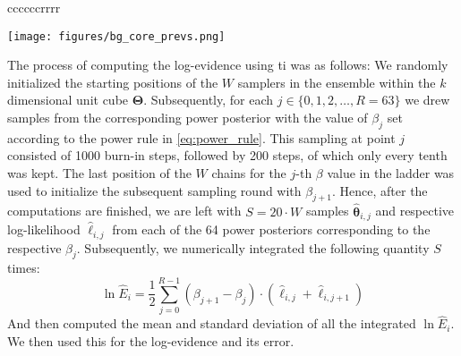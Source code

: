 \documentclass[twocolumn]{aastex631}
\begin{document}
\begin{deluxetable}{ccccccrrrr}
    \startdata
    \enddata
\end{deluxetable}

\begin{figure*}[h]
    \begin{centering}
        \texttt{[image: figures/bg\_core\_prevs.png]}
        \caption{Prevalence of involvement as predicted by the base graph model for different scenarios involving the most commonly metastatic \glspl{lnl} II, III and IV (shaded histograms). The model's predictions are compared to Beta posteriors over the prevalence based on the frequency of the same scenarios and a uniform prior (slid lines). The top panel shows some selected scenarios with early T-category tumors and the bottom panel with advanced T-category. \label{fig:bg_prevalences}}
    \end{centering}
\end{figure*}

The process of computing the log-evidence using \gls{ti} was as follows: We randomly initialized the starting positions of the $W$ samplers in the ensemble within the $k$ dimensional unit cube $\boldsymbol{\Theta}$. Subsequently, for each $j \in \{ 0, 1, 2, \ldots, R=63 \}$ we drew samples from the corresponding power posterior with the value of $\beta_j$ set according to the power rule in \autoref{eq:power_rule}. This sampling at point $j$ consisted of 1000 burn-in steps, followed by 200 steps, of which only every tenth was kept. The last position of the $W$ chains for the $j$-th $\beta$ value in the ladder was used to initialize the subsequent sampling round with $\beta_{j+1}$. Hence, after the computations are finished, we are left with $S = 20 \cdot W$ samples $\boldsymbol{\hat{\theta}}_{i,j}$ and respective log-likelihood $\hat{\ell}_{i,j}$ from each of the 64 power posteriors corresponding to the respective $\beta_j$. Subsequently, we numerically integrated the following quantity $S$ times:
%
\begin{equation}
    \ln \hat{E}_i = \frac{1}{2} \sum_{j=0}^{R-1} \left( \beta_{j+1} - \beta_j \right) \cdot \left( \hat{\ell}_{i,j} + \hat{\ell}_{i,j+1} \right)
\end{equation}
%
And then computed the mean and standard deviation of all the integrated $\ln \hat{E}_i$. We then used this for the log-evidence and its error.
\end{document}
